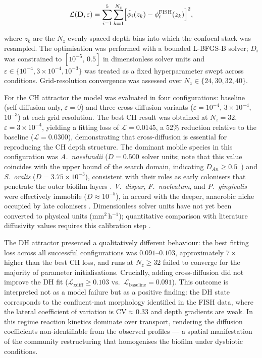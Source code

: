 \begin{equation}
  \mathcal{L}(\mathbf{D}, \varepsilon)
  = \sum_{i=1}^{5} \sum_{k=1}^{N_z}
    \Bigl[\hat{\phi}_i(z_k) - \phi_i^{\mathrm{FISH}}(z_k)\Bigr]^2,
\label{eq:loss}
\end{equation}

\noindent
where $z_k$ are the $N_z$ evenly spaced depth bins into which the confocal stack
was resampled.
The optimisation was performed with a bounded L-BFGS-B solver;
$D_i$ was constrained to $[10^{-5},\, 0.5]$ in dimensionless solver units
and $\varepsilon \in \{10^{-4}, 3\times10^{-4}, 10^{-3}\}$ was treated as a
fixed hyperparameter swept across conditions.
Grid-resolution convergence was assessed over $N_z \in \{24, 30, 32, 40\}$.

For the CH attractor the model was evaluated in four configurations:
baseline (self-diffusion only, $\varepsilon = 0$) and three cross-diffusion
variants ($\varepsilon = 10^{-4}$, $3\times10^{-4}$, $10^{-3}$) at each grid
resolution.
The best CH result was obtained at $N_z = 32$, $\varepsilon = 3\times10^{-4}$,
yielding a fitting loss of $\mathcal{L} = 0.0145$, a 52\% reduction relative to
the baseline ($\mathcal{L} = 0.0300$), demonstrating that cross-diffusion is
essential for reproducing the CH depth structure.
The dominant mobile species in this configuration was \textit{A.~naeslundii}
($D = 0.500$ solver units; note that this value coincides with the upper bound of the
search domain, indicating $D_{An} \geq 0.5$~) and \textit{S.~oralis}
($D = 3.75 \times 10^{-3}$), consistent with their roles as early colonisers that
penetrate the outer biofilm layers \cite{kolenbrander2010}.
\textit{V.~dispar}, \textit{F.~nucleatum}, and \textit{P.~gingivalis} were effectively
immobile ($D \approx 10^{-5}$), in accord with the deeper, anaerobic niche occupied
by late colonisers \cite{haffajee2008}.
Dimensionless solver units have not yet been converted to physical units (mm$^2$\,h$^{-1}$);
quantitative comparison with literature diffusivity values requires this calibration
step .

The DH attractor presented a qualitatively different behaviour: the best fitting loss
across all successful configurations was $0.091$--$0.103$, approximately $7\times$ higher
than the best CH loss, and runs at $N_z \geq 32$ failed to converge for the majority of
parameter initialisations.
Crucially, adding cross-diffusion did not improve the DH fit
($\mathcal{L}_{\mathrm{xdiff}} \geq 0.103$ vs.\ $\mathcal{L}_{\mathrm{baseline}} = 0.091$).
This outcome is interpreted not as a model failure but as a positive finding:
the DH state corresponds to the confluent-mat morphology identified in the FISH data,
where the lateral coefficient of variation is $\mathrm{CV} \approx 0.33$ and
depth gradients are weak.
In this regime reaction kinetics dominate over transport, rendering the diffusion
coefficients non-identifiable from the observed profiles --- a spatial manifestation
of the community restructuring that homogenises the biofilm under dysbiotic conditions.

